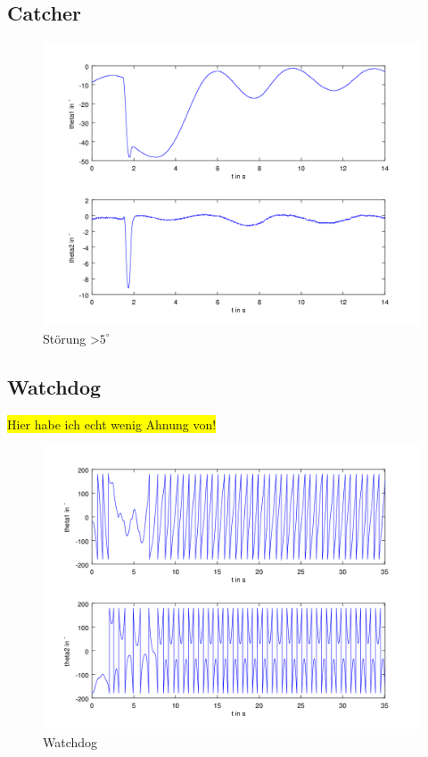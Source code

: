 \subsection{Catcher}
\begin{figure}[htbp]
	\label{fig.Catcher-Plot}
	\centering
	\includegraphics[width=1.\textwidth]{Grafiken/Catch_kurz.png}
	\caption{Störung \textgreater $5^{\circ}$}
\end{figure}

\subsection{Watchdog}
\colorbox{yellow}{Hier habe ich echt wenig Ahnung von!}
\begin{figure}[htbp]
	\label{fig.Watchdog-Plot}
	\centering
	\includegraphics[width=1.\textwidth]{Grafiken/Watchdog_lang.png}
	\caption{Watchdog}
\end{figure}